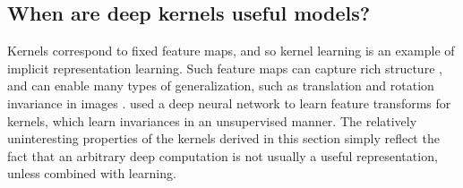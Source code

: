 \subsection{When are deep kernels useful models?}

Kernels correspond to fixed feature maps, and so kernel learning is an example of implicit representation learning. %
Such feature maps can capture rich structure \citep{DuvLloGroetal13}, and can enable many types of generalization, such as translation and rotation invariance in images \citep{kondor2008group}.
\cite{SalHin08} used a deep neural network to learn feature transforms for kernels, which learn invariances in an unsupervised manner.
The relatively uninteresting properties of the kernels derived in this section simply reflect the fact that an arbitrary deep computation is not usually a useful representation, unless combined with learning.




\outbpdocument{


}


